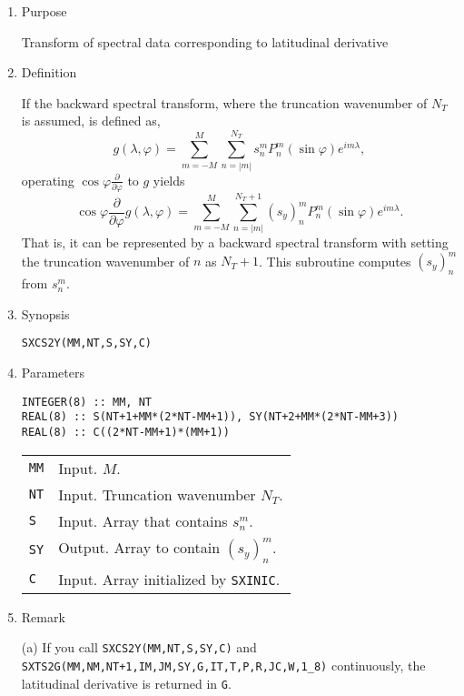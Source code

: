 \documentclass[a4paper]{scrartcl}
\begin{document}
\begin{enumerate}

\item Purpose 

Transform of spectral data 
corresponding to latitudinal derivative

\item Definition

If the backward spectral transform, where the truncation
  wavenumber of $N_T$ is assumed, is defined as,
\begin{equation}
g(\lambda,\varphi)=\sum^M_{m=-M}\sum^{N_T}_{n=|m|}
s^m_nP^m_n(\sin\varphi)e^{im\lambda},
\end{equation}
operating $\cos\varphi\frac{\partial}{\partial\varphi}$ to
$g$ yields
\begin{equation}
\cos\varphi\frac{\partial}{\partial\varphi}
g(\lambda,\varphi)=\sum^M_{m=-M}\sum^{N_T+1}_{n=|m|}
(s_y)^m_nP^m_n(\sin\varphi)e^{im\lambda}.
\end{equation}
That is, it can be represented by a backward spectral transform
with setting the truncation wavenumber of $n$ as $N_T+1$.
This subroutine computes $(s_y)^m_n$ from $s^m_n$.

\item Synopsis 

\texttt{SXCS2Y(MM,NT,S,SY,C)}
  
\item Parameters

\begin{verbatim}
INTEGER(8) :: MM, NT
REAL(8) :: S(NT+1+MM*(2*NT-MM+1)), SY(NT+2+MM*(2*NT-MM+3))  
REAL(8) :: C((2*NT-MM+1)*(MM+1))
\end{verbatim}

\begin{tabular}{ll}
\texttt{MM} & Input. $M$.\\  
\texttt{NT} & Input. Truncation wavenumber $N_T$.\\
\texttt{S} & Input. Array that contains $s^m_n$.\\
\texttt{SY} & Output. Array to contain $(s_y)^m_n$.\\
\texttt{C} & Input. Array initialized by  \texttt{SXINIC}.
\end{tabular}

\item Remark

(a) If you call \texttt{SXCS2Y(MM,NT,S,SY,C)} and \\
  \texttt{SXTS2G(MM,NM,NT+1,IM,JM,SY,G,IT,T,P,R,JC,W,1\_8)}
    continuously, the latitudinal derivative is returned in \texttt{G}.  
    
\end{enumerate}
\end{document}
